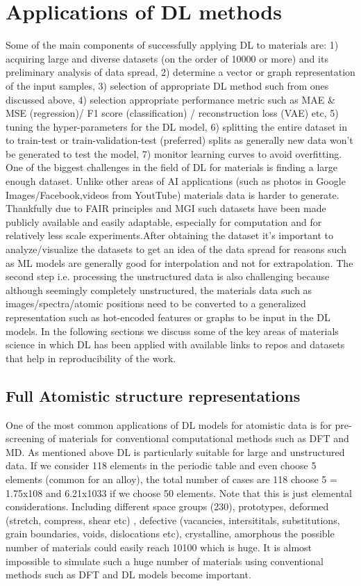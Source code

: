 \documentclass[pdflatex,sn-mathphys]{sn-jnl}%
\theoremstyle{thmstyleone}%
\theoremstyle{thmstyletwo}%
\theoremstyle{thmstylethree}%
\begin{document}
\section{Applications of DL methods}\label{sec:applications}
Some of the main components of successfully applying DL to materials are: 
1) acquiring large and diverse datasets (on the order of 10000 or more) and its preliminary analysis of data spread, 2) determine a vector or graph representation of the input samples, 3) selection of appropriate DL method such from ones discussed above, 4) selection appropriate performance metric such as MAE \& MSE  (regression)/ F1 score (classification) / reconstruction loss (VAE) etc, 5) tuning the hyper-parameters for the DL model, 6) splitting the entire dataset in to train-test or train-validation-test (preferred) splits as generally new data won't be generated to test the model, 7) monitor learning curves to avoid overfitting. One of the biggest challenges in the field of DL for materials is finding a large enough dataset. Unlike other areas of AI applications (such as photos in Google Images/Facebook,videos from YoutTube) materials data is harder to generate. Thankfully due to FAIR principles and MGI such datasets have been made publicly available and easily adaptable, especially for computation and for relatively less scale experiments.After obtaining the dataset it's important to analyze/visualize the datasets to get an idea of the data spread for reasons such as ML models are generally good for interpolation and not for extrapolation. The second step i.e. processing the unstructured data is also challenging because although seemingly completely unstructured, the materials data such as images/spectra/atomic positions need to be converted to a generalized representation such as hot-encoded features or graphs to be input in the DL models. In the following sections we discuss some of the key areas of materials science in which DL has been applied with available links to repos and datasets that help in reproducibility of the work.



\subsection{Full Atomistic structure representations}\label{sec:atomistic}
One of the most common applications of DL models for atomistic data is for pre-screening of materials for conventional computational methods such as DFT and MD. As mentioned above DL is particularly  suitable for large and unstructured data. If we consider 118 elements in the periodic table and even choose 5 elements (common for an alloy), the total number of cases are 118 choose 5 = 1.75x108 and 6.21x1033 if we choose 50 elements. Note that this is just elemental considerations. Including different space groups (230), prototypes, deformed (stretch, compress, shear etc) , defective (vacancies, intersititals, substitutions, grain boundaries, voids, dislocations etc), crystalline, amorphous the possible number of materials could easily reach 10100 which is huge. It is almost impossible to simulate such a huge number of materials using conventional methods such as DFT and DL models become important.
\end{document}
